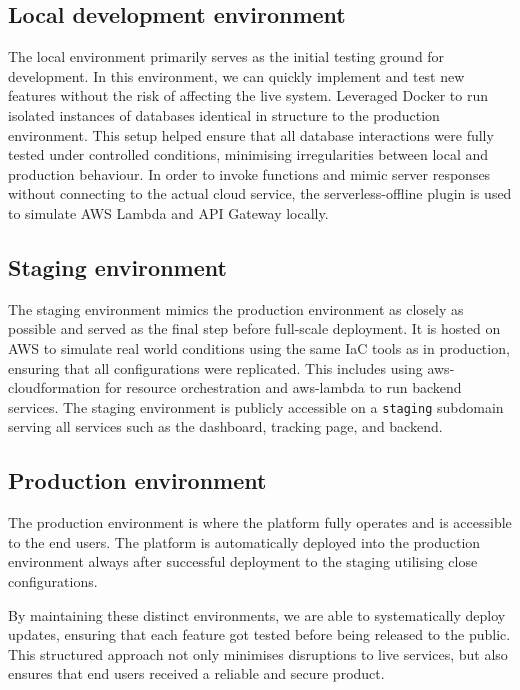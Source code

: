 \subsection{Local development environment}
\label{subsec:local}
The local environment primarily serves as the initial testing ground for development.
In this environment, we can quickly implement and test new features without the risk of affecting the live system. 
Leveraged Docker to run isolated instances of databases identical in structure to the production environment. 
This setup helped ensure that all database interactions were fully tested under controlled conditions, minimising irregularities between local and production behaviour.
In order to invoke functions and mimic server responses without connecting to the actual cloud service, the \gls{serverless-offline} plugin is used to simulate AWS Lambda and API Gateway locally. 

\subsection{Staging environment}
\label{subsec:staging}
The staging environment mimics the production environment as closely as possible and served as the final step before full-scale deployment. 
It is hosted on AWS to simulate real world conditions using the same \ac{IaC} tools as in production, ensuring that all configurations were replicated.
This includes using \gls{aws-cloudformation} for resource orchestration and \gls{aws-lambda} to run backend services.
The staging environment is publicly accessible on a \texttt{staging} subdomain serving all services such as the dashboard, tracking page, and backend.

\subsection{Production environment}
\label{subsec:production}
The production environment is where the platform fully operates and is accessible to the end users.
The platform is automatically deployed into the production environment always after successful deployment to the staging utilising close configurations.

By maintaining these distinct environments, we are able to systematically deploy updates, ensuring that each feature got tested before being released to the public. 
This structured approach not only minimises disruptions to live services, but also ensures that end users received a reliable and secure product.


